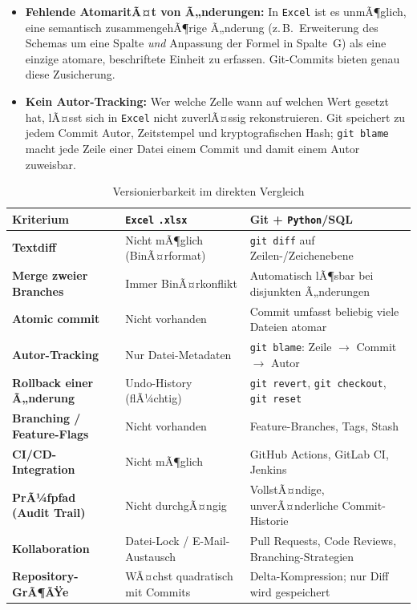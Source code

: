 ﻿\documentclass[12pt,a4paper]{report}
\theoremstyle{definition}
\theoremstyle{remark}
\newcommand{\excel}{\texttt{Excel}}
\newcommand{\py}{\texttt{Python}}
\newcommand{\code}[1]{\texttt{#1}}
\begin{document}
\begin{itemize}[leftmargin=1.5em, itemsep=3pt]
  \item \textbf{Fehlende AtomaritÃ¤t von Ã„nderungen:}
        In \excel{} ist es unmÃ¶glich, eine semantisch zusammengehÃ¶rige
        Ã„nderung (z.\,B.\ Erweiterung des Schemas um eine Spalte
        \emph{und} Anpassung der Formel in Spalte~G) als eine einzige
        atomare, beschriftete Einheit zu erfassen.
        Git-Commits bieten genau diese Zusicherung.

  \item \textbf{Kein Autor-Tracking:}
        Wer welche Zelle wann auf welchen Wert gesetzt hat, lÃ¤sst sich
        in \excel{} nicht zuverlÃ¤ssig rekonstruieren. Git speichert
        zu jedem Commit Autor, Zeitstempel und kryptografischen Hash;
        \code{git blame} macht jede Zeile einer Datei einem
        Commit und damit einem Autor zuweisbar.
\end{itemize}

\begin{table}[H]
\centering
\caption{Versionierbarkeit im direkten Vergleich}
\label{tab:git-vergleich}
\renewcommand{\arraystretch}{1.35}
\begin{tabularx}{\linewidth}{>{\bfseries\footnotesize}l
                              >{\footnotesize}X
                              >{\footnotesize}X}
\toprule
Kriterium                 & \excel{} \code{.xlsx}            & Git + \py{}/SQL \\
\midrule
Textdiff                  & Nicht mÃ¶glich (BinÃ¤rformat)      & \code{git diff} auf Zeilen-/Zeichenebene \\
Merge zweier Branches     & Immer BinÃ¤rkonflikt              & Automatisch lÃ¶sbar bei disjunkten Ã„nderungen \\
Atomic commit             & Nicht vorhanden                  & Commit umfasst beliebig viele Dateien atomar \\
Autor-Tracking            & Nur Datei-Metadaten              & \code{git blame}: Zeile $\to$ Commit $\to$ Autor \\
Rollback einer Ã„nderung   & Undo-History (flÃ¼chtig)          & \code{git revert}, \code{git checkout}, \code{git reset} \\
Branching / Feature-Flags & Nicht vorhanden                  & Feature-Branches, Tags, Stash \\
CI/CD-Integration         & Nicht mÃ¶glich                    & GitHub Actions, GitLab CI, Jenkins \\
PrÃ¼fpfad (Audit Trail)    & Nicht durchgÃ¤ngig                & VollstÃ¤ndige, unverÃ¤nderliche Commit-Historie \\
Kollaboration             & Datei-Lock / E-Mail-Austausch    & Pull Requests, Code Reviews, Branching-Strategien \\
Repository-GrÃ¶ÃŸe          & WÃ¤chst quadratisch mit Commits   & Delta-Kompression; nur Diff wird gespeichert \\
\bottomrule
\end{tabularx}
\end{table}
\end{document}
